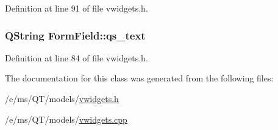 Definition at line 91 of file vwidgets.h.

\hypertarget{classFormField_a1263d00231a1badf214a51c4062f9118}{
\subsubsection[{qs\_\-text}]{\setlength{\rightskip}{0pt plus 5cm}QString {\bf FormField::qs\_\-text}}}
\label{classFormField_a1263d00231a1badf214a51c4062f9118}


Definition at line 84 of file vwidgets.h.



The documentation for this class was generated from the following files:\begin{DoxyCompactItemize}
\item 
/e/ms/QT/models/\hyperlink{vwidgets_8h}{vwidgets.h}\item 
/e/ms/QT/models/\hyperlink{vwidgets_8cpp}{vwidgets.cpp}\end{DoxyCompactItemize}
